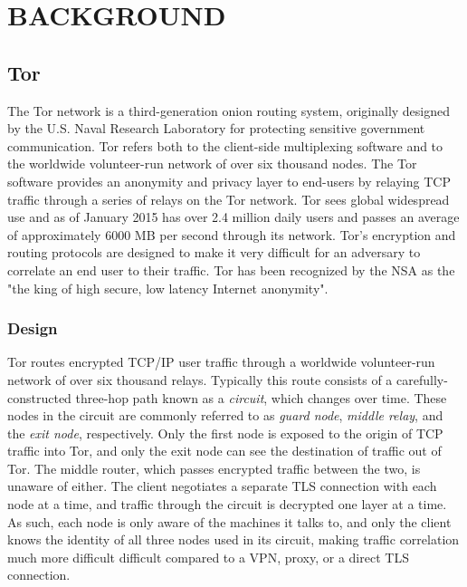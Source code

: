 
\chapter{\uppercase{Background}}

\section{Tor}

The Tor network is a third-generation onion routing system, originally designed by the U.S. Naval Research Laboratory for protecting sensitive government communication. Tor refers both to the client-side multiplexing software and to the worldwide volunteer-run network of over six thousand nodes. The Tor software provides an anonymity and privacy layer to end-users by relaying TCP traffic through a series of relays on the Tor network. Tor sees global widespread use and as of January 2015 has over 2.4 million daily users and passes an average of approximately 6000 MB per second through its network.\cite{TorMetrics} Tor's encryption and routing protocols are designed to make it very difficult for an adversary to correlate an end user to their traffic. Tor has been recognized by the NSA as the "the king of high secure, low latency Internet anonymity".\cite{TorSlidesNSA}

\subsection{Design}

Tor routes encrypted TCP/IP user traffic through a worldwide volunteer-run network of over six thousand relays. Typically this route consists of a carefully-constructed three-hop path known as a \textit{circuit}, which changes over time. These nodes in the circuit are commonly referred to as \textit{guard node}, \textit{middle relay}, and the \textit{exit node}, respectively. Only the first node is exposed to the origin of TCP traffic into Tor, and only the exit node can see the destination of traffic out of Tor. The middle router, which passes encrypted traffic between the two, is unaware of either. The client negotiates a separate TLS connection with each node at a time, and traffic through the circuit is decrypted one layer at a time. As such, each node is only aware of the machines it talks to, and only the client knows the identity of all three nodes used in its circuit, making traffic correlation much more difficult difficult compared to a VPN, proxy, or a direct TLS connection.

